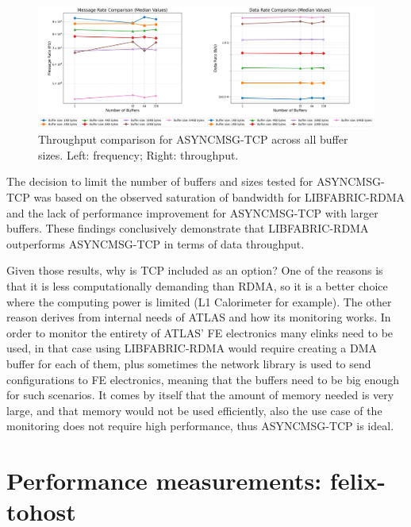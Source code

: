 \begin{figure}[htbp]
\centering
\includegraphics[width=\textwidth]{images/results/tcp_performance_comparison.png}
\caption[Throughput comparison for ASYNCMSG-TCP across all buffer sizes]{Throughput comparison for ASYNCMSG-TCP across all buffer sizes. Left: frequency; Right: throughput.}
\label{fig:tcp-mean-throughput-comparison}
\end{figure}

The decision to limit the number of buffers and sizes tested for ASYNCMSG-TCP was based on the observed saturation of bandwidth for LIBFABRIC-RDMA and the lack of performance improvement for ASYNCMSG-TCP with larger buffers. These findings conclusively demonstrate that LIBFABRIC-RDMA outperforms ASYNCMSG-TCP in terms of data throughput.

Given those results, why is TCP included as an option? One of the reasons is that it is less computationally demanding than \acs{RDMA}, so it is a better choice where the computing power is limited (L1 Calorimeter for example). The other reason derives from internal needs of \acs{ATLAS} and how its monitoring works. In order to monitor the entirety of \acs{ATLAS}' \acl{FE} electronics many elinks need to be used, in that case using LIBFABRIC-RDMA would require creating a \acs{DMA} buffer for each of them, plus sometimes the network library is used to send configurations to \acs{FE} electronics, meaning that the buffers need to be big enough for such scenarios. It comes by itself that the amount of memory needed is very large, and that memory would not be used efficiently, also the use case of the monitoring does not require high performance, thus ASYNCMSG-TCP is ideal.

\clearpage
\section{Performance measurements: felix-tohost}

